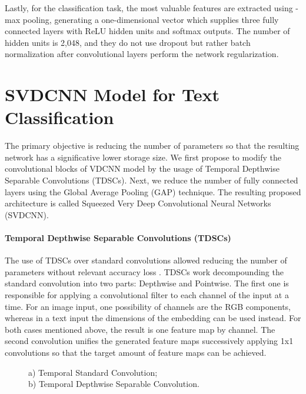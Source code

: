 \documentclass[conference]{IEEEtran}
\begin{document}
Lastly, for the classification task, the  most valuable features  are extracted using -max pooling, generating a one-dimensional vector which supplies three fully connected layers with ReLU hidden units and softmax outputs. The number of hidden units is 2,048, and they do not use dropout but rather batch normalization after convolutional layers perform the network regularization.
\medskip
 
\section{SVDCNN Model for Text Classification}
\medskip
The primary objective is reducing the number of parameters so that the resulting network has a significative lower storage size. We first propose to modify the convolutional blocks of VDCNN model by the usage of Temporal Depthwise Separable Convolutions (TDSCs). Next, we reduce the number of fully connected layers using the Global Average Pooling (GAP) technique. The resulting proposed architecture is called Squeezed Very Deep Convolutional Neural Networks (SVDCNN).

\paragraph{Temporal Depthwise Separable Convolutions (TDSCs)}
The use of TDSCs over standard convolutions allowed reducing the number of parameters without relevant accuracy loss \cite{howard2017mobilenets}. TDSCs work decompounding the standard convolution into two parts: Depthwise and Pointwise. The first one is responsible for applying a convolutional filter to each channel of the input at a time. For an image input, one possibility of channels are the RGB components, whereas in a text input the dimensions of the embedding can be used instead. For both cases mentioned above, the result is one feature map by channel. The second convolution unifies the generated feature maps successively applying 1x1 convolutions so that the target amount of feature maps can be achieved.

\begin{figure}[htbp]
\begin{minipage}[t]{.5\linewidth}
\centering
{}
\end{minipage}\begin{minipage}[t]{.5\linewidth}
\centering
{}
\end{minipage}
\caption{a) Temporal Standard Convolution;\\b) Temporal Depthwise Separable Convolution.}
\label{fig:main}
\end{figure}
\end{document}
